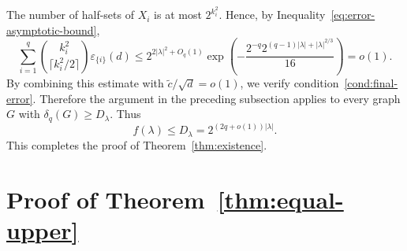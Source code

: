 \documentclass[10pt,a4paper]{amsart}
\numberwithin{equation}{section}
\begin{document}
The number of half-sets of $X_i$ is at most $2^{k_i^2}$. Hence, by
Inequality~\eqref{eq:error-asymptotic-bound},
\[ 
 \sum_{i=1}^q
 \binom{k_i^2}{\lceil k_i^2/2\rceil}\varepsilon_{\{i\}}(d) \leq2^{2|\lambda|^2+O_q(1)}
 \exp\left(
 -\frac{2^{-q}2^{(q-1)|\lambda|+|\lambda|^{2/3}}}{16}
 \right) =o(1). 
\]
By combining this estimate with $\widetilde c/\sqrt d=o(1)$, we verify
condition~\ref{cond:final-error}.
Therefore the argument in the preceding subsection applies to every graph
$G$ with $\delta_q(G)\geq D_\lambda$. Thus
\[
 f(\lambda)\leq D_\lambda
 =2^{(2q+o(1))|\lambda|}.
\]
This completes the proof of Theorem~\ref{thm:existence}.

\section{\texorpdfstring{\thinspace}{}Proof of
Theorem~\ref{thm:equal-upper}}\label{sec:partition}
\end{document}
